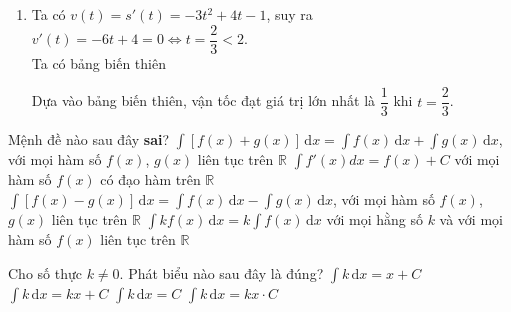 \begin{bt}
{\begin{enumerate}
\begin{itemize}
\begin{center}
				\end{center}
			\end{itemize}
			\item Ta có $v(t)=s'(t)=-3t^2+4t-1$, suy ra $v'(t)=-6t+4=0\Leftrightarrow t=\dfrac{2}{3}<2$.\\
			Ta có bảng biến thiên
			\begin{center}
			\end{center}
			Dựa vào bảng biến thiên, vận tốc đạt giá trị lớn nhất là $\dfrac{1}{3}$ khi $t=\dfrac{2}{3}$.
		\end{enumerate}
	}
\end{bt}

\begin{ex}%
	Mệnh đề nào sau  đây \textbf{sai}?
	\choice 
		{$\displaystyle\int[f(x)+g(x)]\,\mathrm{d}x=\displaystyle\int f(x)\,\mathrm{d}x+\displaystyle\int g(x)\,\mathrm{d}x$, với  mọi hàm số $f(x)$, $g(x)$ liên tục trên $\mathbb{R}$}
		{$\displaystyle\int f'(x)dx=f(x)+C$ với  mọi hàm số $f(x)$ có đạo hàm trên $\mathbb{R}$}
		{$\displaystyle\int[f(x)-g(x)]\,\mathrm{d}x=\displaystyle\int f(x)\,\mathrm{d}x-\displaystyle\int g(x)\,\mathrm{d}x$, với  mọi hàm số $f(x)$, $g(x)$ liên tục trên $\mathbb{R}$}
		{\True $\displaystyle\int kf(x)\,\mathrm{d}x=k\displaystyle\int f(x)\,\mathrm{d}x$ với mọi hằng số $k$ và với mọi hàm số $f(x)$ liên tục trên $\mathbb{R}$} 
\end{ex}

\begin{ex}%
	Cho số thực $k\ne 0$.  Phát biểu nào sau đây là đúng?
	\choice 
		{$\displaystyle\int k \mathrm{\,d}x =  x+C$}
		 {\True $\displaystyle\int k \mathrm{\,d}x = kx+C$}
		{$\displaystyle\int k \mathrm{\,d}x =  C$}
		{$\displaystyle\int  k \mathrm{\,d}x = kx \cdot C$}
\end{ex}

